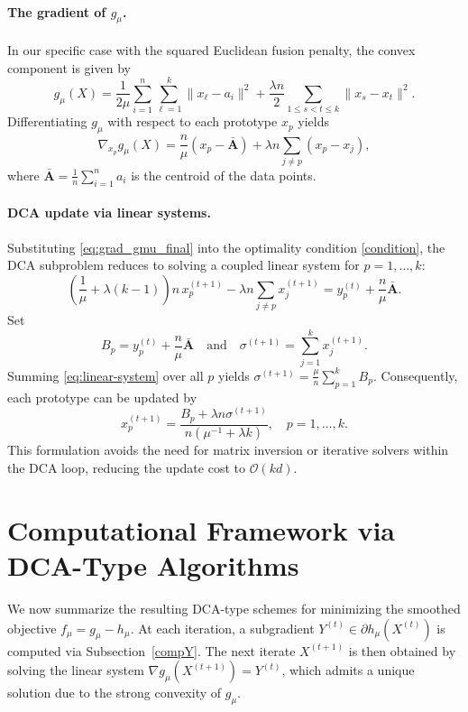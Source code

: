 \documentclass[11pt]{article}
\theoremstyle{definition}
\newcommand{\1}{\mathbf{1}}
\begin{document}
\paragraph{The gradient of  $g_\mu$.}
In our specific case with the squared Euclidean fusion penalty, the convex component is given by
\[
g_\mu(X) = \frac{1}{2\mu} \sum_{i=1}^n \sum_{\ell=1}^k \|x_\ell - a_i\|^2
+ \frac{\lambda n}{2} \sum_{1 \le s < t \le k} \|x_s - x_t\|^2.
\]
Differentiating $g_\mu$ with respect to each prototype $x_p$ yields
\begin{equation}\label{eq:grad_gmu_final}
\nabla_{x_p} g_\mu(X)
=
\frac{n}{\mu}(x_p - \bar{\mathbf{A}})
+
\lambda n \sum_{j \neq p} (x_p - x_j),
\end{equation}
where $\bar{\mathbf{A}} = \frac{1}{n} \sum_{i=1}^n a_i$ is the centroid of the data points.

\paragraph{DCA update via linear systems.}
Substituting \eqref{eq:grad_gmu_final} into the optimality condition \eqref{condition}, the DCA subproblem reduces to solving a coupled linear system for $p=1,\dots,k$:
\begin{equation}\label{eq:linear-system}
\left( \frac{1}{\mu} + \lambda(k-1) \right) n\, x_p^{(t+1)}
-
\lambda n \sum_{j \neq p} x_j^{(t+1)}
=
y_p^{(t)} + \frac{n}{\mu} \bar{\mathbf{A}}.
\end{equation}
Set $$B_p = y_p^{(t)} + \frac{n}{\mu} \bar{\mathbf{A}}\quad\text{and}\quad\sigma^{(t+1)} = \sum_{j=1}^k x_j^{(t+1)}.$$ 
Summing \eqref{eq:linear-system} over all $p$ yields $\sigma^{(t+1)} = \frac{\mu}{n} \sum_{p=1}^k B_p$. Consequently, each prototype can be updated by
\begin{equation} \label{eq:closed-form-update}
x_p^{(t+1)} = \frac{B_p + \lambda n \sigma^{(t+1)}}{n(\mu^{-1} + \lambda k)}, \quad p=1,\dots,k.
\end{equation}
This formulation avoids the need for matrix inversion or iterative solvers within the DCA loop, reducing the update cost to $\mathcal{O}(kd)$.


\section{Computational Framework via DCA-Type Algorithms} \label{section5}

We now summarize the resulting DCA-type schemes for minimizing the smoothed objective $f_\mu = g_\mu - h_\mu$. At each iteration, a subgradient $Y^{(t)} \in \partial h_\mu(X^{(t)})$ is computed via Subsection~\ref{compY}. The next iterate $X^{(t+1)}$ is then obtained by solving the linear system $\nabla g_\mu(X^{(t+1)}) = Y^{(t)}$, which admits a unique solution due to the strong convexity of $g_\mu$.
\end{document}
